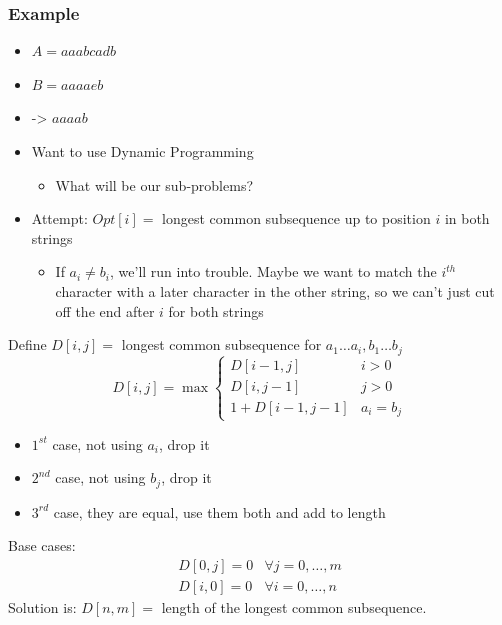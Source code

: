 \documentclass[11pt]{article}
\begin{document}
\subsubsection{Example}
\label{sec:orge95eb15}
\begin{itemize}
\item \(A=aaabcadb\)
\item \(B=aaaaeb\)
\item -> \(aaaab\)
\item Want to use Dynamic Programming
\begin{itemize}
\item What will be our sub-problems?
\end{itemize}
\item Attempt: \(Opt[i] =\) longest common subsequence up to position \(i\) in both strings
\begin{itemize}
\item If \(a_i \neq b_i\), we'll run into trouble. Maybe we want to match the \(i^{th}\) character with a later character in the other string, so we can't just cut off the end after \(i\) for both strings
\end{itemize}
\end{itemize}
Define \(D[i,j]=\) longest common subsequence for \(a_1 \ldots a_i, b_1 \ldots b_j\)
\begin{equation*}
D[i,j] = \max 
\begin{cases}
D[i-1, j] & i>0
\\ D[i,j-1] & j>0
\\ 1+D[i-1,j-1] & a_i=b_j
\end{cases}
\end{equation*}
\begin{itemize}
\item \(1^{st}\) case, not using \(a_i\), drop it
\item \(2^{nd}\) case, not using \(b_j\), drop it
\item \(3^{rd}\) case, they are equal, use them both and add to length
\end{itemize}
Base cases: 
\begin{align*}
D[0,j]=0 & \forall j=0 , \ldots , m
\\ D[i,0]=0 & \forall i=0, \ldots, n
\end{align*}
Solution is: \(D[n,m] =\) length of the longest common subsequence.
\end{document}
